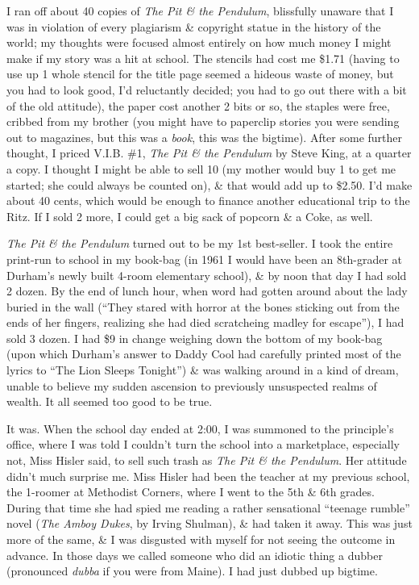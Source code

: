 \documentclass{article}
\numberwithin{equation}{section}
\begin{document}
I ran off about 40 copies of \textit{The Pit \& the Pendulum}, blissfully unaware that I was in violation of every plagiarism \& copyright statue in the history of the world; my thoughts were focused almost entirely on how much money I might make if my story was a hit at school. The stencils had cost me \$1.71 (having to use up 1 whole stencil for the title page seemed a hideous waste of money, but you had to look good, I'd reluctantly decided; you had to go out there with a bit of the old attitude), the paper cost another 2 bits or so, the staples were free, cribbed from my brother (you might have to paperclip stories you were sending out to magazines, but this was a \textit{book}, this was the bigtime). After some further thought, I priced V.I.B. \#1, \textit{The Pit \& the Pendulum} by Steve King, at a quarter a copy. I thought I might be able to sell 10 (my mother would buy 1 to get me started; she could always be counted on), \& that would add up to \$2.50. I'd make about 40 cents, which would be enough to finance another educational trip to the Ritz. If I sold 2 more, I could get a big sack of popcorn \& a Coke, as well.

\textit{The Pit \& the Pendulum} turned out to be my 1st best-seller. I took the entire print-run to school in my book-bag (in 1961 I would have been an 8th-grader at Durham's newly built 4-room elementary school), \& by noon that day I had sold 2 dozen. By the end of lunch hour, when word had gotten around about the lady buried in the wall (``They stared with horror at the bones sticking out from the ends of her fingers, realizing she had died scratcheing madley for escape''), I had sold 3 dozen. I had \$9 in change weighing down the bottom of my book-bag (upon which Durham's answer to Daddy Cool had carefully printed most of the lyrics to ``The Lion Sleeps Tonight'') \& was walking around in a kind of dream, unable to believe my sudden ascension to previously unsuspected realms of wealth. It all seemed too good to be true.

It was. When the school day ended at 2:00, I was summoned to the principle's office, where I was told I couldn't turn the school into a marketplace, especially not, Miss Hisler said, to sell such trash as \textit{The Pit \& the Pendulum}. Her attitude didn't much surprise me. Miss Hisler had been the teacher at my previous school, the 1-roomer at Methodist Corners, where I went to the 5th \& 6th grades. During that time she had spied me reading a rather sensational ``teenage rumble'' novel (\textit{The Amboy Dukes}, by Irving Shulman), \& had taken it away. This was just more of the same, \& I was disgusted with myself for not seeing the outcome in advance. In those days we called someone who did an idiotic thing a dubber (pronounced \textit{dubba} if you were from Maine). I had just dubbed up bigtime.
\end{document}
